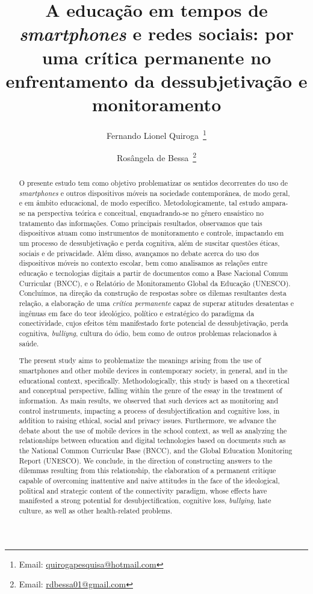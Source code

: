 \documentclass[portuguese]{textolivre}
\title{A educação em tempos de \textit{smartphones} e redes sociais: por uma crítica permanente no enfrentamento da dessubjetivação e monitoramento}
\author[1]{Fernando Lionel Quiroga~\orcid{0000-0003-4172-2002}\thanks{Email: \href{mailto:quirogapesquisa@hotmail.com}{quirogapesquisa@hotmail.com}}}
\author[2]{Rosângela de Bessa~\orcid{0009-0007-1967-5760}\thanks{Email: \href{mailto:rdbessa01@gmail.com}{rdbessa01@gmail.com}}}
\affil[1]{Centro de Ensino e Aprendizagem em Rede, Programa de Pós-Graduação em Educação, Linguagens e Tecnologias, Anápolis, GO, Brasil.}
\affil[2]{Universidade Estadual de Goiás, Anápolis, GO, Brasil.}
\begin{document}
\maketitle
\begin{polyabstract}
\begin{abstract}
O presente estudo tem como objetivo problematizar os sentidos decorrentes do uso de \textit{smartphones} e outros dispositivos móveis na sociedade contemporânea, de modo geral, e em âmbito educacional, de modo específico. Metodologicamente, tal estudo ampara-se na perspectiva teórica e conceitual, enquadrando-se no gênero ensaístico no tratamento das informações. Como principais resultados, observamos que tais dispositivos atuam como instrumentos de monitoramento e controle, impactando em um processo de dessubjetivação e perda cognitiva, além de suscitar questões éticas, sociais e de privacidade. Além disso, avançamos no debate acerca do uso dos dispositivos móveis no contexto escolar, bem como analisamos as relações entre educação e tecnologias digitais a partir de documentos como a Base Nacional Comum Curricular (BNCC), e o Relatório de Monitoramento Global da Educação (UNESCO). Concluímos, na direção da construção de respostas sobre os dilemas resultantes desta relação, a elaboração de uma \textit{crítica permanente} capaz de superar atitudes desatentas e ingênuas em face do teor ideológico, político e estratégico do paradigma da conectividade, cujos efeitos têm manifestado forte potencial de dessubjetivação, perda cognitiva, \textit{bulliyng}, cultura do ódio, bem como de outros problemas relacionados à saúde.

\end{abstract}

\begin{english}
\begin{abstract}
The present study aims to problematize the meanings arising from the use of smartphones and other mobile devices in contemporary society, in general, and in the educational context, specifically. Methodologically, this study is based on a theoretical and conceptual perspective, falling within the genre of the essay in the treatment of information. As main results, we observed that such devices act as monitoring and control instruments, impacting a process of desubjectification and cognitive loss, in addition to raising ethical, social and privacy issues. Furthermore, we advance the debate about the use of mobile devices in the school context, as well as analyzing the relationships between education and digital technologies based on documents such as the National Common Curricular Base (BNCC), and the Global Education Monitoring Report (UNESCO). We conclude, in the direction of constructing answers to the dilemmas resulting from this relationship, the elaboration of a permanent critique capable of overcoming inattentive and naive attitudes in the face of the ideological, political and strategic content of the connectivity paradigm, whose effects have manifested a strong potential for desubjectification, cognitive loss, \textit{bullying}, hate culture, as well as other health-related problems.


\end{abstract}
\end{english}
\end{polyabstract}
\end{document}
